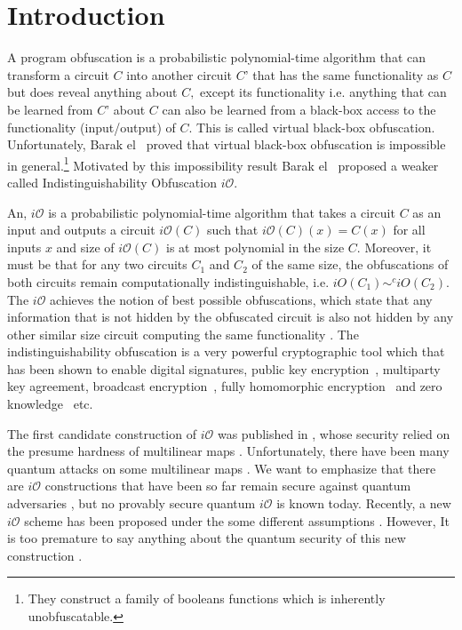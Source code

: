 \section{Introduction}
A program obfuscation is a probabilistic polynomial-time algorithm that can transform a circuit $C$ into another circuit $C’$ that has the same functionality as $C$ but does reveal anything about $C,$ except its functionality i.e. anything that can be learned from $C’$ about $C$ can also be learned from a black-box access to the functionality (input/output) of $C.$ This is called virtual black-box obfuscation. Unfortunately, Barak el~\cite{BGI+12}  proved that virtual black-box obfuscation is impossible in general.\footnote{They construct a family of booleans functions which is inherently unobfuscatable.} Motivated by this impossibility result Barak el~\cite{BGI+12} proposed a weaker called Indistinguishability Obfuscation $i\mathcal{O}.$ 

An, $i\mathcal{O}$ is a probabilistic polynomial-time algorithm that takes a circuit $C$ as an input and outputs a circuit $i\mathcal{O}(C)$ such that $i\mathcal{O}(C)(x)=C(x)$ for all inputs $x$ and size of $i\mathcal{O}(C)$ is at most polynomial in the size $C.$ Moreover, it must be that for any two circuits $C_1$ and $C_2$ of the same size, the obfuscations of both circuits remain computationally indistinguishable, i.e. $iO(C_1)\sim^c iO(C_2).$ The $i\mathcal{O}$ achieves the notion of best possible obfuscations, which state that any information that is not hidden by the obfuscated circuit is also not hidden by any other similar size circuit computing the same functionality \cite{GR2014}. The indistinguishability obfuscation is a very powerful cryptographic tool which that has been shown to enable digital signatures, public key encryption~\cite{SW14}, multiparty key agreement, broadcast encryption~\cite{BZ14}, fully homomorphic encryption~\cite{CLTV15} and zero knowledge~\cite{BP15} etc. 

The first candidate construction of $i\mathcal{O}$ was published in \cite{GGH+13}, whose security relied on the presume hardness of multilinear maps \cite{CLT13,GCH13, LSS14, GGH15}. Unfortunately, there have been many quantum attacks on some multilinear maps \cite{ABD16, CDPR16, CGH17}. We want to emphasize that there are $i\mathcal{O}$ constructions that have been so far remain secure against quantum adversaries \cite{Z19}, but no provably secure quantum $i\mathcal{O}$ is known today. Recently, a new $i\mathcal{O}$ scheme has been proposed under the some different assumptions \cite{ALMS19}. However, It is too premature to say anything about the quantum security of this new construction \cite{ALMS19}. 

